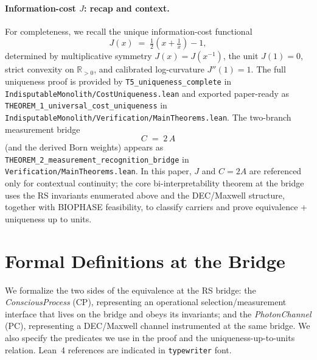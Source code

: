 \documentclass[12pt,a4paper]{article}
\begin{document}
\paragraph{Information-cost \(J\): recap and context.}
For completeness, we recall the unique information-cost functional
\begin{equation}
  J(x) \;=\; \tfrac{1}{2}\!\left(x+\tfrac{1}{x}\right)-1,
\end{equation}
determined by multiplicative symmetry \(J(x)=J(x^{-1})\), the unit \(J(1)=0\), strict convexity on \(\mathbb{R}_{>0}\), and calibrated log-curvature \(J''(1)=1\). The full uniqueness proof is provided by \texttt{T5\_uniqueness\_complete} in \texttt{IndisputableMonolith/CostUniqueness.lean} and exported paper-ready as \texttt{THEOREM\_1\_universal\_cost\_uniqueness} in \texttt{IndisputableMonolith/Verification/MainTheorems.lean}. The two-branch measurement bridge
\begin{equation}
  C \;=\; 2\,A
\end{equation}
(and the derived Born weights) appears as \texttt{THEOREM\_2\_measurement\_recognition\_bridge} in \texttt{Verification/MainTheorems.lean}. In this paper, \(J\) and \(C{=}2A\) are referenced only for contextual continuity; the core bi-interpretability theorem at the bridge uses the RS invariants enumerated above and the DEC/Maxwell structure, together with BIOPHASE feasibility, to classify carriers and prove equivalence + uniqueness up to units.

\section{Formal Definitions at the Bridge}
\label{sec:formal-defs}

We formalize the two sides of the equivalence at the RS bridge: the \emph{ConsciousProcess} (CP), representing an operational selection/measurement interface that lives on the bridge and obeys its invariants; and the \emph{PhotonChannel} (PC), representing a DEC/Maxwell channel instrumented at the same bridge. We also specify the predicates we use in the proof and the uniqueness-up-to-units relation. Lean~4 references are indicated in \texttt{typewriter} font.
\end{document}
